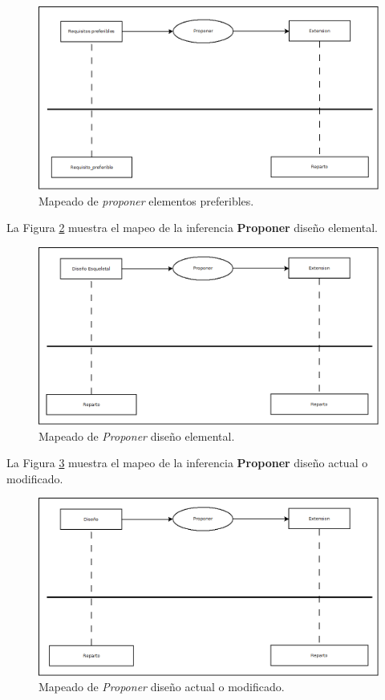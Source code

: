 \begin{figure}[H]
  \centering
  \includegraphics[scale=0.35]{imaxes/PreferiblesProponerExtension.png}
  \caption{\label{fig:PreferiblesProponerExtension}Mapeado de \textit{proponer} elementos preferibles.}
\end{figure}
 
La Figura \ref{fig:DisenoEsqueletalProponerExtension} muestra el mapeo de la inferencia \textbf{Proponer} diseño elemental.

\begin{figure}[H]
  \centering
  \includegraphics[scale=0.35]{imaxes/DisenoEsqueletalProponerExtension.png}
  \caption{\label{fig:DisenoEsqueletalProponerExtension}Mapeado de \textit{Proponer} diseño elemental.}
\end{figure}

La Figura \ref{fig:DisenoProponerExtension} muestra el mapeo de la inferencia \textbf{Proponer} diseño actual o modificado.

\begin{figure}[H]
  \centering
  \includegraphics[scale=0.35]{imaxes/DisenoProponerExtension.png}
  \caption{\label{fig:DisenoProponerExtension}Mapeado de \textit{Proponer} diseño actual o modificado.}
\end{figure}


